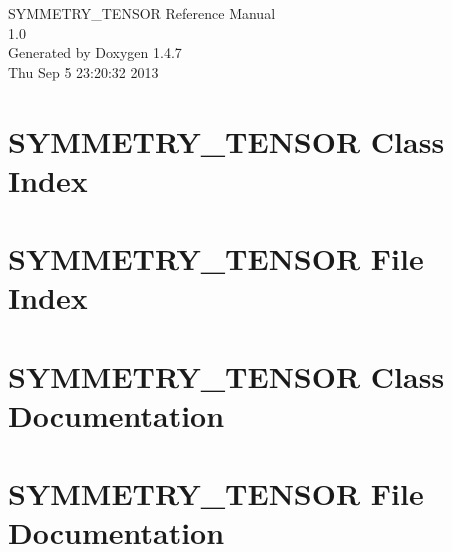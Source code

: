 \documentclass[a4paper]{book}
\begin{document}
\begin{titlepage}
\vspace*{7cm}
\begin{center}
{\Large SYMMETRY\_\-TENSOR Reference Manual\\[1ex]\large 1.0 }\\
\vspace*{1cm}
{\large Generated by Doxygen 1.4.7}\\
\vspace*{0.5cm}
{\small Thu Sep 5 23:20:32 2013}\\
\end{center}
\end{titlepage}
\clearemptydoublepage
{}
\tableofcontents
\clearemptydoublepage
{}
\chapter{SYMMETRY\_\-TENSOR Class Index}

\chapter{SYMMETRY\_\-TENSOR File Index}

\chapter{SYMMETRY\_\-TENSOR Class Documentation}


\chapter{SYMMETRY\_\-TENSOR File Documentation}


\printindex
\end{document}
